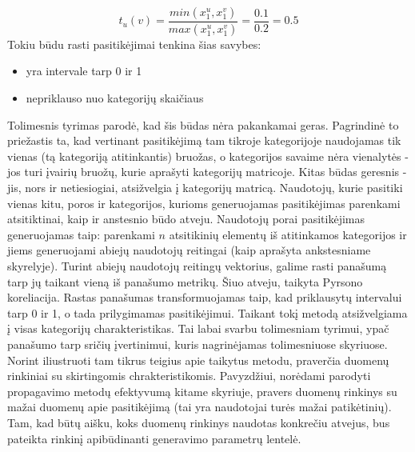 \documentclass{VUMIFInfMagistrinis}
\begin{document}
\begin{equation}
t_u(v) = \frac{min(x_1^u, x_1^v)}{max(x_1^u, x_1^v)} = \frac{0.1}{0.2} = 0.5
\end{equation}
Tokiu būdu rasti pasitikėjimai tenkina šias savybes:
\begin{itemize}
	\item yra intervale tarp 0 ir 1
	\item nepriklauso nuo kategorijų skaičiaus
\end{itemize}
\indent
Tolimesnis tyrimas parodė, kad šis būdas nėra pakankamai geras. Pagrindinė to priežastis ta, kad vertinant pasitikėjimą tam tikroje kategorijoje naudojamas tik vienas (tą kategoriją atitinkantis) bruožas, o kategorijos savaime nėra vienalytės - jos turi įvairių bruožų, kurie aprašyti kategorijų matricoje. 
\newline
\indent
Kitas būdas geresnis - jis, nors ir netiesiogiai, atsižvelgia į kategorijų matricą. Naudotojų, kurie pasitiki vienas kitu, poros ir kategorijos, kurioms generuojamas pasitikėjimas parenkami atsitiktinai, kaip ir anstesnio būdo atveju. Naudotojų porai pasitikėjimas generuojamas taip: parenkami $n$ atsitikinių elementų iš atitinkamos kategorijos ir jiems generuojami abiejų naudotojų reitingai (kaip aprašyta ankstesniame skyrelyje). Turint abiejų naudotojų reitingų vektorius, galime rasti panašumą tarp jų taikant vieną iš panašumo metrikų. Šiuo atveju, taikyta Pyrsono koreliacija. Rastas panašumas transformuojamas taip, kad priklausytų intervalui tarp 0 ir 1, o tada prilygimamas pasitikėjimui. Taikant tokį metodą atsižvelgiama į visas kategorijų charakteristikas. Tai labai svarbu tolimesniam tyrimui, ypač panašumo tarp sričių įvertinimui, kuris nagrinėjamas tolimesniuose skyriuose.
\indent
Norint iliustruoti tam tikrus teigius apie taikytus metodu, praverčia duomenų rinkiniai su skirtingomis chrakteristikomis. Pavyzdžiui, norėdami parodyti propagavimo metodų efektyvumą kitame skyriuje, pravers duomenų rinkinys su mažai duomenų apie pasitikėjimą (tai yra naudotojai turės mažai patikėtinių). Tam, kad būtų aišku, koks duomenų rinkinys naudotas konkrečiu atvejus, bus pateikta rinkinį apibūdinanti generavimo parametrų lentelė. 
\end{document}
